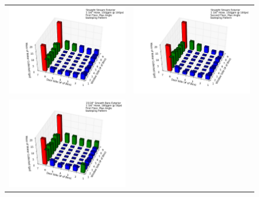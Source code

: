 \documentclass{article}
\begin{document}


\begin{figure}[ht]
\begin{tabular*}{\textwidth}{lr}
\includegraphics[width=3.2in]{../ADD_Analysis/Figures/15-12-08_113716_Datafile_Straight_Stream_Exterior.png} &
\includegraphics[width=3.2in]{../ADD_Analysis/Figures/15-12-07_145842_Datafile_Straight_Stream_Exterior.png} \\
\includegraphics[width=3.2in]{../ADD_Analysis/Figures/15-12-08_101825_Datafile_15_16in_Smooth_Bore_Exterior.png} &

\end{tabular*}
\end{figure}
\end{document}
